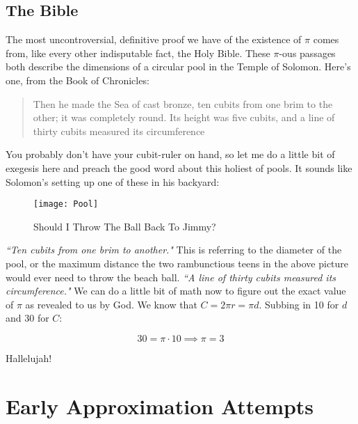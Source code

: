 \documentclass[11pt,titlepage]{article}
\begin{document}
\subsection*{The Bible}

The most uncontroversial, definitive proof we have of the existence of $\pi$ comes from, like every other indisputable fact, the Holy Bible. These $\pi$-ous passages both describe the dimensions of a circular pool in the Temple of Solomon. Here's one, from the Book of Chronicles:
\begin{quote}
Then he made the Sea of cast bronze, ten cubits from one brim to the other; it was completely round. Its height was five cubits, and a line of thirty cubits measured its circumference 
\vspace{-0.8cm}
\end{quote}

You probably don't have your cubit-ruler on hand, so let me do a little bit of exegesis here and preach the good word about this holiest of pools. It sounds like Solomon's setting up one of these in his backyard:
\label{Jimmy}
\begin{figure}[h]
\centering
\texttt{[image: Pool]}
\caption{Should I Throw The Ball Back To Jimmy?\protect\footnotemark}

\end{figure}

\textit{``Ten cubits from one brim to another."}
This is referring to the diameter of the pool, or the maximum distance the two rambunctious teens in the above picture would ever need to throw the beach ball.
\textit{``A line of thirty cubits measured its circumference."}
We can do a little bit of math now to figure out the exact value of $\pi$ as revealed to us by God. We know that $C = 2\pi r  = \pi d$. Subbing in 10 for $d$ and $30$ for $C$:

$$30 = \pi \cdot 10 \implies \pi = 3$$

Hallelujah!

\section*{Early Approximation Attempts}
\end{document}
